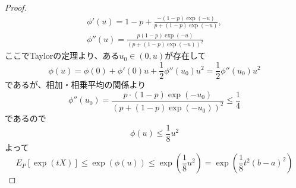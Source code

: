 \begin{proof}
\begin{gather*}
                    \phi'(u)=1-p+\frac{-(1-p)\exp(-u)}{p+(1-p)\exp(-u)},\\
                    \phi''(u)=\frac{p(1-p)\exp(-u)}{(p+(1-p)\exp(-u))^{2}}
                \end{gather*}
                ここでTaylorの定理より、ある$u_0\in(0,u)$が存在して
                \[\phi(u)=\phi(0)+\phi'(0)u+\frac{1}{2}\phi''(u_{0})u^{2}=\frac{1}{2}\phi''(u_{0})u^{2}\]
                であるが、相加・相乗平均の関係より
                \[\phi''(u_{0})=\frac{p\cdot(1-p)\exp(-u_{0})}{(p+(1-p)\exp(-u_{0}))^{2}}\le\frac{1}{4}\]
                であるので
                \[\phi(u)\le\frac{1}{8}u^{2}\]
                よって
                \[E_{P}[\exp(tX)]\le\exp(\phi(u) )\le\exp\left(\frac{1}{8}u^{2}\right)=\exp\left(\frac{1}{8}t^{2}(b-a)^{2}\right)\]
            \end{proof}
